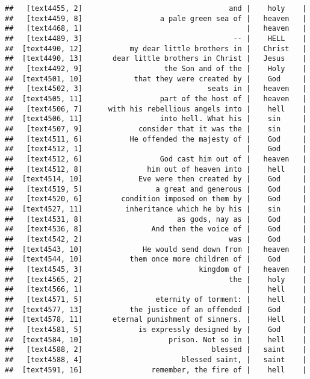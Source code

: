 \documentclass[]{article}
\begin{document}
\begin{verbatim}
##   [text4455, 2]                                  and |    holy    |
##   [text4459, 8]                  a pale green sea of |   heaven   |
##   [text4468, 1]                                      |   heaven   |
##   [text4489, 3]                                   -- |    HELL    |
##  [text4490, 12]           my dear little brothers in |   Christ   |
##  [text4490, 13]       dear little brothers in Christ |   Jesus    |
##   [text4492, 9]                   the Son and of the |    Holy    |
##  [text4501, 10]            that they were created by |    God     |
##   [text4502, 3]                             seats in |   heaven   |
##  [text4505, 11]                  part of the host of |   heaven   |
##   [text4506, 7]      with his rebellious angels into |    hell    |
##  [text4506, 11]                  into hell. What his |    sin     |
##   [text4507, 9]             consider that it was the |    sin     |
##   [text4511, 6]           He offended the majesty of |    God     |
##   [text4512, 1]                                      |    God     |
##   [text4512, 6]                  God cast him out of |   heaven   |
##   [text4512, 8]               him out of heaven into |    hell    |
##  [text4514, 10]             Eve were then created by |    God     |
##   [text4519, 5]                 a great and generous |    God     |
##   [text4520, 6]         condition imposed on them by |    God     |
##  [text4527, 11]          inheritance which he by his |    sin     |
##   [text4531, 8]                      as gods, nay as |    God     |
##   [text4536, 8]                And then the voice of |    God     |
##   [text4542, 2]                                  was |    God     |
##  [text4543, 10]              He would send down from |   heaven   |
##  [text4544, 10]           them once more children of |    God     |
##   [text4545, 3]                           kingdom of |   heaven   |
##   [text4565, 2]                                  the |    holy    |
##   [text4566, 1]                                      |    hell    |
##   [text4571, 5]                 eternity of torment: |    hell    |
##  [text4577, 13]           the justice of an offended |    God     |
##  [text4578, 11]       eternal punishment of sinners. |    Hell    |
##   [text4581, 5]             is expressly designed by |    God     |
##  [text4584, 10]                    prison. Not so in |    hell    |
##   [text4588, 2]                              blessed |   saint    |
##   [text4588, 4]                       blessed saint, |   saint    |
##  [text4591, 16]                remember, the fire of |    hell    |

\end{verbatim}
\end{document}
